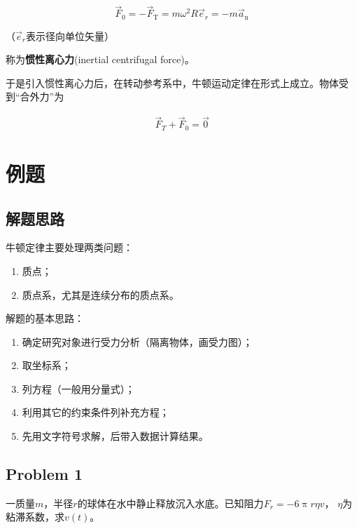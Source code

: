\documentclass[12pt, a4paper]{article}
\numberwithin{equation}{section}
\begin{document}
    \begin{equation}
        \overrightarrow{F}_0=-\overrightarrow{F}_{\mathrm{T}}=m \omega^2 R \overrightarrow{e}_r=-m \overrightarrow{a}_{\mathrm{n}}
    \end{equation}

    （\(\overrightarrow{e}_r\)表示径向单位矢量）

    称为\textbf{惯性离心力}(inertial centrifugal force)。

    于是引入惯性离心力后，在转动参考系中，牛顿运动定律在形式上成立。物体受到“合外力”为

    \begin{align*}
        \overrightarrow{F}_{T} + \overrightarrow{F}_{0} = \overrightarrow{0}
    \end{align*}

\section{例题}

\subsection{解题思路}

    牛顿定律主要处理两类问题：

    \begin{enumerate}
        \item 质点；
        \item 质点系，尤其是连续分布的质点系。
    \end{enumerate}

    解题的基本思路：

    \begin{enumerate}
        \item 确定研究对象进行受力分析（隔离物体，画受力图）；
        \item 取坐标系；
        \item 列方程（一般用分量式）；
        \item 利用其它的约束条件列补充方程；
        \item 先用文字符号求解，后带入数据计算结果。
    \end{enumerate}

\subsection{Problem 1}

    一质量\(m\)，半径\(r\)的球体在水中静止释放沉入水底。已知阻力\(F_{r} = - 6 \uppi r \eta v\)，
    \(\eta\)为粘滞系数，求\(v\left(t\right)\)。
    \vspace{1em}
\end{document}
